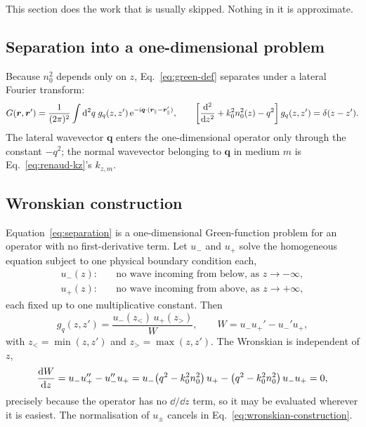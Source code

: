 This section does the work that is usually skipped.  Nothing in it is
approximate.

\subsection{Separation into a one-dimensional problem}

Because $n_0^2$ depends only on $z$, Eq.~\eqref{eq:green-def} separates under a
lateral Fourier transform:
\begin{equation}
  G(\bm r,\bm r')
  =\frac{1}{(2\pi)^2}\int\mathop{}\!\mathrm{d}^2q\;g_q(z,z')\,
   \mathrm{e}^{-\mathrm{i}\bm q\cdot(\bm{r}_{\parallel}-\bm{r}_{\parallel}')},
  \qquad
  \left[\frac{\mathop{}\!\mathrm{d}^2}{\mathop{}\!\mathrm{d} z^2}+k_0^2n_0^2(z)-q^2\right]g_q(z,z')
  =\delta(z-z').
  \label{eq:separation}
\end{equation}
The lateral wavevector $\bm q$ enters the one-dimensional operator only through
the constant $-q^2$; the normal wavevector belonging to $\bm q$ in medium $m$
is Eq.~\eqref{eq:renaud-kz}'s $k_{z,m}$.

\subsection{Wronskian construction}

Equation~\eqref{eq:separation} is a one-dimensional Green-function problem for
an operator with no first-derivative term.  Let $u_-$ and $u_+$ solve the
homogeneous equation subject to one physical boundary condition each,
\begin{align}
  u_-(z):&\quad\text{no wave incoming from below, as }z\to-\infty,
  \label{eq:bc-minus}\\
  u_+(z):&\quad\text{no wave incoming from above, as }z\to+\infty,
  \label{eq:bc-plus}
\end{align}
each fixed up to one multiplicative constant.  Then
\begin{equation}
  g_q(z,z')=\frac{u_-(z_<)\,u_+(z_>)}{W},
  \qquad
  W=u_-u_+'-u_-'u_+,
  \label{eq:wronskian-construction}
\end{equation}
with $z_<=\min(z,z')$ and $z_>=\max(z,z')$.  The Wronskian is independent of
$z$,
\begin{equation}
  \frac{\mathop{}\!\mathrm{d} W}{\mathop{}\!\mathrm{d} z}
  =u_-u_+''-u_-''u_+
  =u_-\!\left(q^2-k_0^2n_0^2\right)u_+
   -\left(q^2-k_0^2n_0^2\right)u_-u_+=0,
  \label{eq:wronskian-constant}
\end{equation}
precisely because the operator has no $\dd/\dd z$ term, so it may be evaluated
wherever it is easiest.  The normalisation of $u_\pm$ cancels in
Eq.~\eqref{eq:wronskian-construction}.


